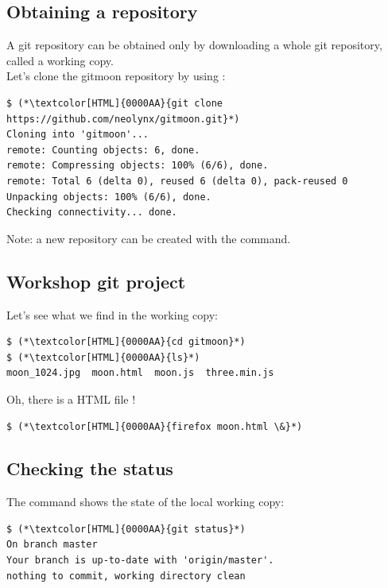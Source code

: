 \subsection{Obtaining a repository}
\begin{frame}[fragile]
  \subslidetitle
  A git repository can be obtained only by downloading a whole git repository,
  called a working copy.
  \\
  \vspace{1em}
  Let's clone the gitmoon repository by using :
  \begin{lstlisting}
$ (*\textcolor[HTML]{0000AA}{git clone https://github.com/neolynx/gitmoon.git}*)
Cloning into 'gitmoon'...
remote: Counting objects: 6, done.
remote: Compressing objects: 100% (6/6), done.
remote: Total 6 (delta 0), reused 6 (delta 0), pack-reused 0
Unpacking objects: 100% (6/6), done.
Checking connectivity... done.
\end{lstlisting}

  \vspace{1em}
  Note: a new repository can be created with the  command.
\end{frame}

\subsection{Workshop git project}
\begin{frame}[fragile]
  \subslidetitle
  Let's see what we find in the working copy:
  \begin{lstlisting}
$ (*\textcolor[HTML]{0000AA}{cd gitmoon}*)
$ (*\textcolor[HTML]{0000AA}{ls}*)
moon_1024.jpg  moon.html  moon.js  three.min.js
\end{lstlisting}

  \vspace{1em}
  Oh, there is a HTML file !
  \begin{lstlisting}
$ (*\textcolor[HTML]{0000AA}{firefox moon.html \&}*)
\end{lstlisting}
\end{frame}

\subsection{Checking the status}
\begin{frame}[fragile]
  \subslidetitle

  The command  shows the state of the local working copy:
  \begin{lstlisting}
$ (*\textcolor[HTML]{0000AA}{git status}*)
On branch master
Your branch is up-to-date with 'origin/master'.
nothing to commit, working directory clean
\end{lstlisting}
\end{frame}



